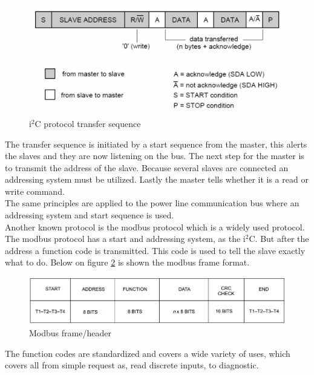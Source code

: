 \begin{figure}[H]
	\centering
	\includegraphics[width=.8\textwidth]{billeder/10technologystudies/7-bit-address-writing}
	\caption{i$^2$C protocol transfer sequence}
	\label{fig:i2cheader}
\end{figure}

The transfer sequence is initiated by a start sequence from the master, this alerts the slaves and they are now listening on the bus. The next step for the master is to transmit the address of the slave. Because several slaves are connected an addressing system must be utilized. Lastly the master tells whether it is a read or write command. \\
The same principles are applied to the power line communication bus where an addressing system and start sequence is used.\\

Another known protocol is the modbus protocol which is a widely used protocol. The modbus protocol has a start and addressing system, as the i$^2$C. But after the address a function code is transmitted. This code is used to tell the slave exactly what to do. Below on figure \ref{fig:modbusframe} is shown the modbus frame format.

\begin{figure}[H]
	\centering
	\includegraphics[width=.8\textwidth]{billeder/10technologystudies/modbusframe}
	\caption{Modbus frame/header}
	\label{fig:modbusframe}
\end{figure}

The function codes are standardized and covers a wide variety of uses, which covers all from simple request as, read discrete inputs, to diagnostic.

